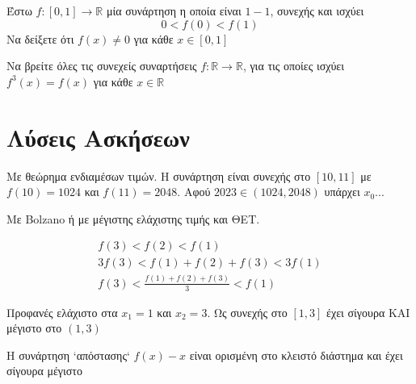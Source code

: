 \documentclass{presentation}
\begin{document}
\begin{askisi}
  Έστω $f:[0,1]\to\mathbb{R}$ μία συνάρτηση η οποία είναι $1-1$, συνεχής και ισχύει
  $$0<f(0)<f(1)$$
  Να δείξετε ότι $f(x)\ne 0$ για κάθε $x\in [0,1]$
\end{askisi}

\begin{askisi}
  Να βρείτε όλες τις συνεχείς συναρτήσεις $f:\mathbb{R}\to\mathbb{R}$, για τις οποίες ισχύει $f^3(x)=f(x)$ για κάθε $x\in\mathbb{R}$
\end{askisi}

\section{}

\appendix
\section{Λύσεις Ασκήσεων}
\begin{frame}
  \tableofcontents
\end{frame}

\begin{lisi}
  Με θεώρημα ενδιαμέσων τιμών. Η συνάρτηση είναι συνεχής στο $[10,11]$ με $f(10)=1024$ και $f(11)=2048$. Αφού $2023\in (1024,2048)$ υπάρχει $x_0$...

  \hyperlink{Άσκηση1}{}
\end{lisi}

\begin{lisi}
  Με Bolzano ή με μέγιστης ελάχιστης τιμής και ΘΕΤ.

  \begin{gather*}
    f(3)<f(2)<f(1) \\
    3f(3)<f(1)+f(2)+f(3)<3f(1) \\
    f(3)<\frac{f(1)+f(2)+f(3)}{3}<f(1)
  \end{gather*}

  \hyperlink{Άσκηση2}{}
\end{lisi}

\begin{lisi}
  Προφανές ελάχιστο στα $x_1=1$ και $x_2=3$. Ως συνεχής στο $[1,3]$ έχει σίγουρα ΚΑΙ μέγιστο στο $(1,3)$

  \hyperlink{Άσκηση3}{}
\end{lisi}

\begin{lisi}
  Η συνάρτηση `απόστασης` $f(x)-x$ είναι ορισμένη στο κλειστό διάστημα και έχει σίγουρα μέγιστο

  \hyperlink{Άσκηση4}{}
\end{lisi}
\end{document}
